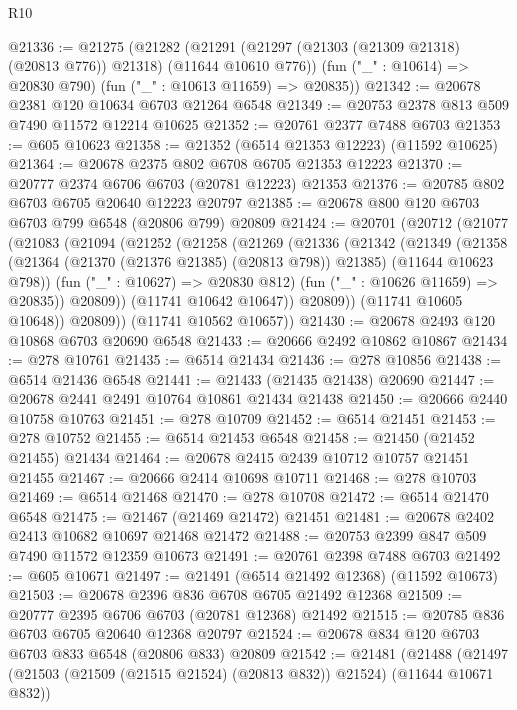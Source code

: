\begin{lexlean}{R10}
\begin{coremodule}
@21336 := @21275
    (@21282
      (@21291 (@21297 (@21303 (@21309 @21318) (@20813 @776)) @21318) (@11644 @10610 @776))
      (fun ("_" : @10614) => @20830 @790)
      (fun ("_" : @10613 @11659) => @20835))
@21342 := @20678 @2381 @120 @10634 @6703 @21264 @6548
@21349 := @20753 @2378 @813 @509 @7490 @11572 @12214 @10625
@21352 := @20761 @2377 @7488 @6703
@21353 := @605 @10623
@21358 := @21352 (@6514 @21353 @12223) (@11592 @10625)
@21364 := @20678 @2375 @802 @6708 @6705 @21353 @12223
@21370 := @20777 @2374 @6706 @6703 (@20781 @12223) @21353
@21376 := @20785 @802 @6703 @6705 @20640 @12223 @20797
@21385 := @20678 @800 @120 @6703 @6703 @799 @6548 (@20806 @799) @20809
@21424 := @20701
    (@20712
      (@21077
        (@21083
          (@21094
            (@21252
              (@21258
                (@21269
                  (@21336
                    (@21342
                      (@21349
                        (@21358
                          (@21364 (@21370 (@21376 @21385) (@20813 @798)) @21385)
                          (@11644 @10623 @798))
                        (fun ("_" : @10627) => @20830 @812)
                        (fun ("_" : @10626 @11659) => @20835))
                      @20809))
                  (@11741 @10642 @10647))
                @20809))
            (@11741 @10605 @10648))
          @20809))
      (@11741 @10562 @10657))
@21430 := @20678 @2493 @120 @10868 @6703 @20690 @6548
@21433 := @20666 @2492 @10862 @10867
@21434 := @278 @10761
@21435 := @6514 @21434
@21436 := @278 @10856
@21438 := @6514 @21436 @6548
@21441 := @21433 (@21435 @21438) @20690
@21447 := @20678 @2441 @2491 @10764 @10861 @21434 @21438
@21450 := @20666 @2440 @10758 @10763
@21451 := @278 @10709
@21452 := @6514 @21451
@21453 := @278 @10752
@21455 := @6514 @21453 @6548
@21458 := @21450 (@21452 @21455) @21434
@21464 := @20678 @2415 @2439 @10712 @10757 @21451 @21455
@21467 := @20666 @2414 @10698 @10711
@21468 := @278 @10703
@21469 := @6514 @21468
@21470 := @278 @10708
@21472 := @6514 @21470 @6548
@21475 := @21467 (@21469 @21472) @21451
@21481 := @20678 @2402 @2413 @10682 @10697 @21468 @21472
@21488 := @20753 @2399 @847 @509 @7490 @11572 @12359 @10673
@21491 := @20761 @2398 @7488 @6703
@21492 := @605 @10671
@21497 := @21491 (@6514 @21492 @12368) (@11592 @10673)
@21503 := @20678 @2396 @836 @6708 @6705 @21492 @12368
@21509 := @20777 @2395 @6706 @6703 (@20781 @12368) @21492
@21515 := @20785 @836 @6703 @6705 @20640 @12368 @20797
@21524 := @20678 @834 @120 @6703 @6703 @833 @6548 (@20806 @833) @20809
@21542 := @21481
    (@21488
      (@21497 (@21503 (@21509 (@21515 @21524) (@20813 @832)) @21524) (@11644 @10671 @832))

\end{coremodule}
\end{lexlean}
